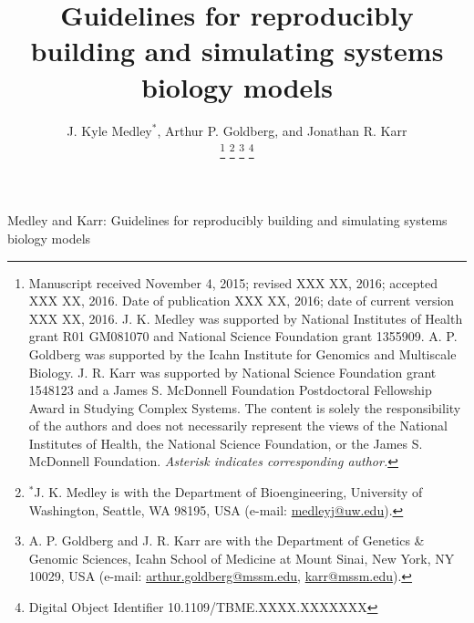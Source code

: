 \documentclass[journal,transmag,twoside]{IEEEtran}
\newcommand{\email}[1]{\href{mailto:#1}{#1}}
\begin{document}
\newcommand{\thetitle}{Guidelines for reproducibly building and simulating systems biology models}
\title{\thetitle}

\author{
    J. Kyle Medley$^*$,
    Arthur P. Goldberg, and
	Jonathan R. Karr
    
    \thanks{
        Manuscript received November 4, 2015; revised XXX XX, 2016; accepted XXX XX, 2016. Date of publication XXX XX, 2016; date of current version XXX XX, 2016.
        J. K. Medley was supported by National Institutes of Health grant R01 GM081070 and National Science Foundation grant 1355909. A. P. Goldberg was supported by the Icahn Institute for Genomics and Multiscale Biology. J. R. Karr was supported by National Science Foundation grant 1548123 and a James S. McDonnell Foundation Postdoctoral Fellowship Award in Studying Complex Systems. The content is solely the responsibility of the authors and does not necessarily represent the views of the National Institutes of Health, the National Science Foundation, or the James S. McDonnell Foundation.
        \textit{Asterisk indicates corresponding author.}
    }
    \thanks{$^*$J. K. Medley is with the Department of Bioengineering, University of Washington, Seattle, WA 98195, USA (e-mail: \email{medleyj@uw.edu}).}
    \thanks{A. P. Goldberg and J. R. Karr are with the Department of Genetics \& Genomic Sciences, Icahn School of Medicine at Mount Sinai, New York, NY 10029, USA (e-mail: \email{arthur.goldberg@mssm.edu}, \email{karr@mssm.edu}).}
    \thanks{Digital Object Identifier 10.1109/TBME.XXXX.XXXXXXX}
}

%
{Medley and Karr: \thetitle}
% 







\end{document}
